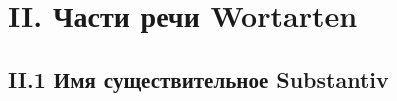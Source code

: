 \documentclass[12pt]{article}
\begin{document}
    \section{II. Части речи \hfill Wortarten}

    \subsection{II.1 Имя существительное \hfill Substantiv}
\end{document}
